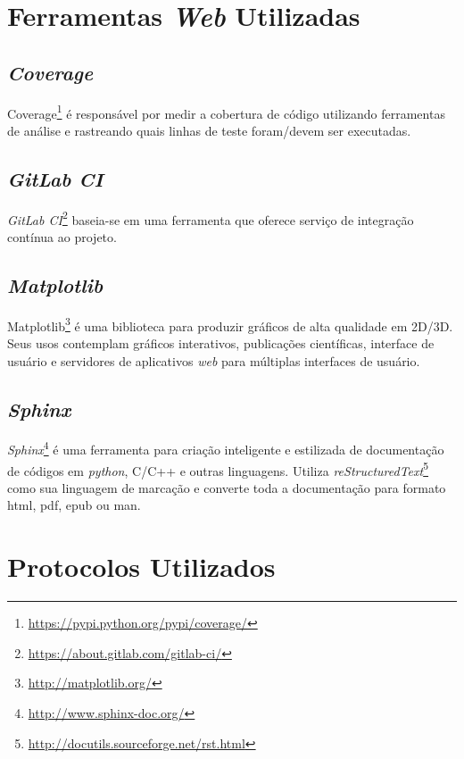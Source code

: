 \section{Ferramentas \textit{Web} Utilizadas}
    \subsection{\textit{Coverage}}
    Coverage\footnote{\url{https://pypi.python.org/pypi/coverage/}} é responsável por medir a cobertura de código utilizando ferramentas de análise e rastreando quais
    linhas de teste foram/devem ser executadas.

    \subsection{\textit{GitLab CI}}
    \textit{GitLab CI}\footnote{\url{https://about.gitlab.com/gitlab-ci/}} baseia-se em uma ferramenta que oferece serviço de integração contínua ao projeto.

    \subsection{\textit{Matplotlib}}
    Matplotlib\footnote{\url{http://matplotlib.org/}} é uma biblioteca para produzir gráficos de alta qualidade em 2D/3D. Seus usos contemplam gráficos interativos, publicações científicas, interface de usuário e servidores de aplicativos \textit{web} para múltiplas interfaces de usuário.

    \subsection{\textit{Sphinx}}
    \textit{Sphinx}\footnote{\url{http://www.sphinx-doc.org/}} é uma ferramenta para criação inteligente e estilizada de documentação de códigos em \textit{python}, C/C++
    e outras linguagens. Utiliza \textit{reStructuredText}\footnote{\url{http://docutils.sourceforge.net/rst.html}} como sua linguagem de marcação e converte toda a documentação para formato html, pdf, epub ou man.

\section{Protocolos Utilizados}
